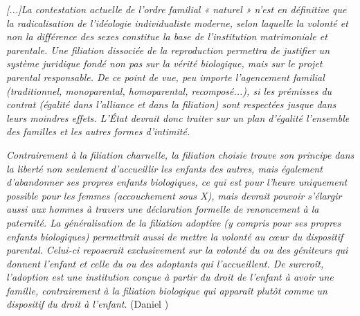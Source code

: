 \begin{displayquote}
{\emph{[...]La contestation actuelle de l'ordre familial « naturel » n'est en définitive que la radicalisation de l'idéologie individualiste moderne, selon laquelle la volonté et non la différence des sexes constitue la base de l'institution matrimoniale et parentale. Une filiation dissociée de la reproduction permettra de justifier un système juridique fondé non pas sur la vérité biologique, mais sur le projet parental responsable. De ce point de vue, peu importe l'agencement familial (traditionnel, monoparental, homoparental, recomposé...), si les prémisses du contrat (égalité dans l'alliance et dans la filiation) sont respectées jusque dans leurs moindres effets. L'État devrait donc traiter sur un plan d'égalité l'ensemble des familles et les autres formes d'intimité.}

\emph{Contrairement à la filiation charnelle, la filiation choisie trouve son principe dans la liberté non seulement d'accueillir les enfants des autres, mais également d'abandonner ses propres enfants biologiques, ce qui est pour l'heure uniquement possible pour les femmes (accouchement sous X), mais devrait pouvoir s'élargir aussi aux hommes à travers une déclaration formelle de renoncement à la paternité. La généralisation de la filiation adoptive (y compris pour ses propres enfants biologiques) permettrait aussi de mettre la volonté au cœur du dispositif parental. Celui-ci reposerait exclusivement sur la volonté du ou des géniteurs qui donnent l'enfant et celle du ou des adoptants qui l'accueillent. De surcroît, l'adoption est une institution conçue à partir du droit de l'enfant à avoir une famille, contrairement à la filiation biologique qui apparaît plutôt comme un dispositif du droit à l'enfant}. (Daniel )}\end{displayquote}


